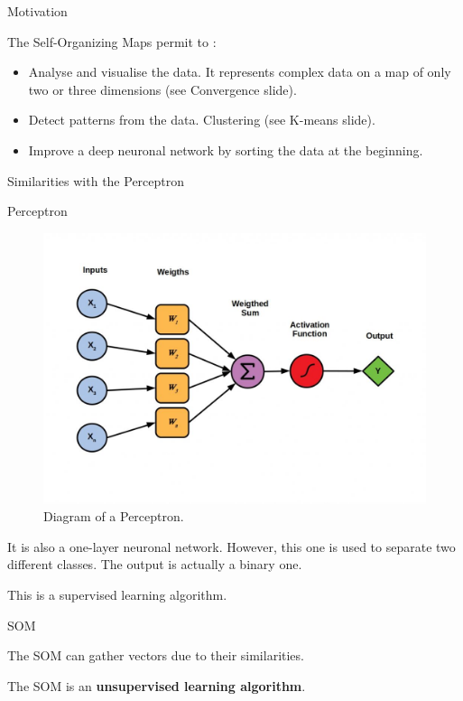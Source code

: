 \documentclass{beamer}
\begin{document}
	
	\begin{frame}{Motivation}

		The Self-Organizing Maps permit to : 

		\begin{itemize}
		
			\item Analyse and visualise the data. It represents complex data on a map of only two or three dimensions (see Convergence slide).

			\item Detect patterns from the data. Clustering (see K-means slide).

			\item Improve a deep neuronal network by sorting the data at the beginning.

		\end{itemize}


	\end{frame}
	
		
	\begin{frame}{Similarities with the Perceptron}
	
		\begin{block}{Perceptron}

			\begin{center}
				
				\begin{figure}[h]

					\includegraphics[width=0.4\linewidth]{pics/Perceptrons-1024x724.jpeg}
					\caption{Diagram of a Perceptron.}	
				\end{figure}
			\end{center}

			It is also a one-layer neuronal network. However, this one is used to separate two different classes. The output is actually a binary one. 

			This is a supervised learning algorithm.
		\end{block}

		
		\begin{block}{SOM}
		
			The SOM can gather vectors due to their similarities.

			The SOM is an \textbf{unsupervised learning algorithm}.
		\end{block}



	\end{frame}
	
\end{document}
